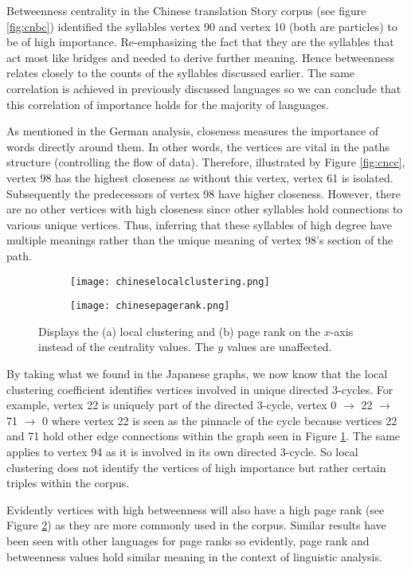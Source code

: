 Betweenness centrality in the Chinese translation Story corpus (see figure \ref{fig:cnbc}) identified the syllables vertex 90 and vertex 10 (both are particles) to be of high importance. Re-emphasizing the fact that they are the syllables that act most like bridges and needed to derive further meaning. Hence betweenness relates closely to the counts of the syllables discussed earlier. The same correlation is achieved in previously discussed languages so we can conclude that this correlation of importance holds for the majority of languages.

As mentioned in the German analysis, closeness measures the importance of words directly around them. In other words, the vertices are vital in the paths structure (controlling the flow of data). Therefore, illustrated by Figure \ref{fig:cncc}, vertex 98 has the highest closeness as without this vertex, vertex 61 is isolated. Subsequently the predecessors of vertex 98 have higher closeness. However, there are no other vertices with high closeness since other syllables hold connections to various unique vertices. Thus, inferring that these syllables of high degree have multiple meanings rather than the unique meaning of vertex 98's section of the path.

\begin{figure}[!htb]
\centering
\begin{subfigure}{.45\textwidth}
	\hspace{-1cm} 
	\texttt{[image: chineselocalclustering.png]}
	\caption{}
	\label{fig:cnlc}
\end{subfigure}
\hfill
\begin{subfigure}{.45\textwidth}
	\hspace{-1cm} 
	\texttt{[image: chinesepagerank.png]}
	\caption{}
	\label{fig:cnpr}
\end{subfigure}
\caption{Displays the (a) local clustering and (b) page rank on the $x$-axis instead of the centrality values. The $y$ values are unaffected.}
\label{fig:cnother}
\end{figure}

By taking what we found in the Japanese graphs, we now know that the local clustering coefficient identifies vertices involved in unique directed 3-cycles. For example, vertex 22 is uniquely part of the directed 3-cycle, vertex 0 $\rightarrow$ 22 $\rightarrow$ 71 $\rightarrow$ 0 where vertex 22 is seen as the pinnacle of the cycle because vertices 22 and 71 hold other edge connections within the graph seen in Figure \ref{fig:cnlc}. The same applies to vertex 94 as it is involved in its own directed 3-cycle. So local clustering does not identify the vertices of high importance but rather certain triples within the corpus.

Evidently vertices with high betweenness will also have a high page rank (see Figure \ref{fig:cnpr}) as they are more commonly used in the corpus. Similar results have been seen with other languages for page ranks so evidently, page rank and betweenness values hold similar meaning in the context of linguistic analysis.


